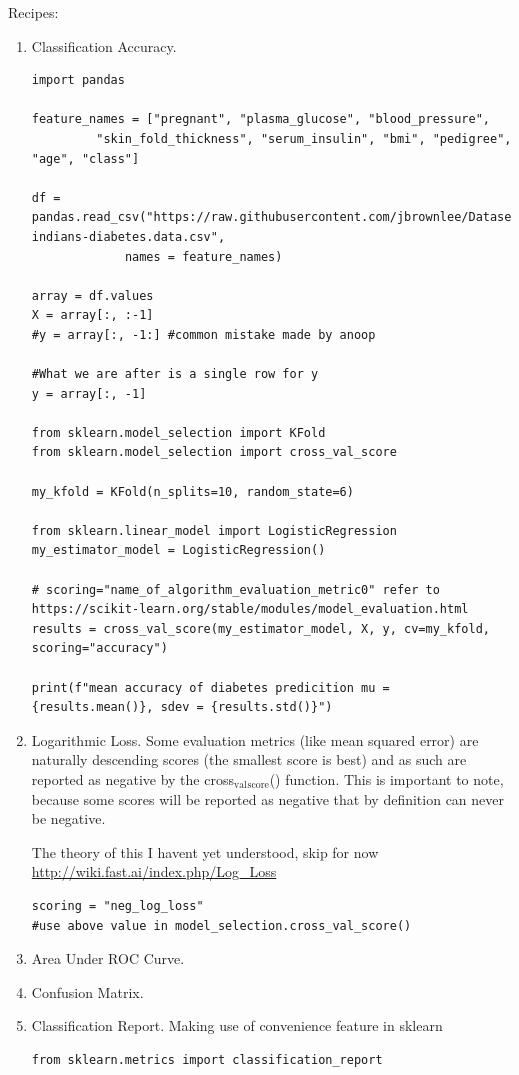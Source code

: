 \documentclass[11pt]{article}
\begin{document}
Recipes:
\begin{enumerate}
\item Classification Accuracy.
\label{sec:org091b394}
\begin{verbatim}
import pandas

feature_names = ["pregnant", "plasma_glucose", "blood_pressure", 
		 "skin_fold_thickness", "serum_insulin", "bmi", "pedigree", "age", "class"]

df = pandas.read_csv("https://raw.githubusercontent.com/jbrownlee/Datasets/master/pima-indians-diabetes.data.csv", 
		     names = feature_names)

array = df.values
X = array[:, :-1]
#y = array[:, -1:] #common mistake made by anoop

#What we are after is a single row for y
y = array[:, -1]

from sklearn.model_selection import KFold
from sklearn.model_selection import cross_val_score

my_kfold = KFold(n_splits=10, random_state=6)

from sklearn.linear_model import LogisticRegression
my_estimator_model = LogisticRegression()

# scoring="name_of_algorithm_evaluation_metric0" refer to https://scikit-learn.org/stable/modules/model_evaluation.html
results = cross_val_score(my_estimator_model, X, y, cv=my_kfold, scoring="accuracy")

print(f"mean accuracy of diabetes predicition mu = {results.mean()}, sdev = {results.std()}")
\end{verbatim}
\item Logarithmic Loss.
\label{sec:org6804dc0}
Some evaluation metrics (like mean squared error) are naturally
descending scores (the smallest score is best) and as such are
reported as negative by the cross\(_{\text{val}}\)\(_{\text{score}}\)() function. This is
important to note, because some scores will be reported as negative
that by definition can never be negative.

The theory of this I havent yet understood, skip for now
\url{http://wiki.fast.ai/index.php/Log\_Loss}

\begin{verbatim}
scoring = "neg_log_loss"
#use above value in model_selection.cross_val_score()

\end{verbatim}
\item Area Under ROC Curve.
\label{sec:org9284a35}
\item Confusion Matrix.
\label{sec:org8d635ab}
\item Classification Report.
\label{sec:orgdcb010a}
Making use of convenience feature in sklearn
\begin{verbatim}
from sklearn.metrics import classification_report
\end{verbatim}
\end{enumerate}
\end{document}
